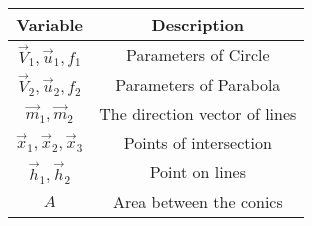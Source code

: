 \begin{tabular}[12pt]{ |c| c|}
    \hline
    \textbf{Variable} & \textbf{Description}\\ 
    \hline
    $\vec{V}_1,\vec{u}_1,f_1$ & Parameters of Circle \\
    \hline 
    $\vec{V}_2,\vec{u}_2,f_2$ & Parameters of Parabola \\
    \hline
    $\vec{m}_1, \vec{m}_2$ & The direction vector of lines \\
    \hline
     $\vec{x}_1,\vec{x}_2,\vec{x}_3$ & Points of intersection \\
     \hline
     $\vec{h}_1, \vec{h}_2$ & Point on lines \\
     \hline
     $A$ & Area between the conics \\
    \hline
\end{tabular}
